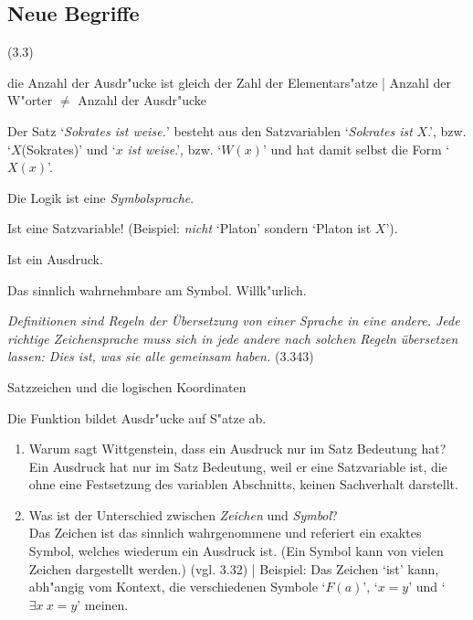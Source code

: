\documentclass[emulatestandardclasses]{scrartcl}
\begin{document}
\subsection{Neue Begriffe}

\begin{description}[leftmargin=!,labelwidth=\widthof{\bfseries Logische Syntax}]
   \item[Kontextprinzip] (3.3)
  \item[Ausdruck] die Anzahl der Ausdr"ucke ist gleich der Zahl der Elementars"atze | Anzahl der W"orter $\neq$ Anzahl der Ausdr"ucke
  \item[Satzvariable] Der Satz `\emph{Sokrates ist weise.}' besteht aus den Satzvariablen `\emph{Sokrates ist} $X$.', bzw. `$X$(Sokrates)' und `$x$ \emph{ist weise}.', bzw. `$W(x)$' und hat damit selbst die Form `$X(x)$'. 
  \item[Logische Syntax] Die Logik ist eine \emph{Symbolsprache}.
  \item[Name] Ist eine Satzvariable! (Beispiel: \emph{nicht} `Platon' sondern `Platon ist $X$').
  \item[Symbol] Ist ein Ausdruck. 
  \item[Zeichen] Das sinnlich wahrnehmbare am Symbol. Willk"urlich.
  \item[Definition] \emph{Definitionen sind Regeln der Übersetzung von einer Sprache in eine andere. Jede richtige Zeichensprache muss sich in jede andere nach solchen Regeln übersetzen lassen: Dies ist, was sie alle gemeinsam haben.} (3.343)
  \item[Logischer Ort] Satzzeichen und die logischen Koordinaten
\end{description}

Die Funktion bildet Ausdr"ucke auf S"atze ab.

\begin{enumerate}
  \item {\color{NavyBlue}Warum sagt Wittgenstein, dass ein Ausdruck nur im Satz Bedeutung hat?}\\
{\color{ForestGreen} Ein Ausdruck hat nur im Satz Bedeutung, weil er eine Satzvariable ist, die ohne eine Festsetzung des variablen Abschnitts, keinen Sachverhalt darstellt.}
  \item {\color{NavyBlue}Was ist der Unterschied zwischen \emph{Zeichen} und \emph{Symbol}? }\\
{\color{ForestGreen} Das Zeichen ist das sinnlich wahrgenommene und referiert ein exaktes Symbol, welches wiederum ein Ausdruck ist. (Ein Symbol kann von vielen Zeichen dargestellt werden.) (vgl. 3.32)} | Beispiel: Das Zeichen `ist' kann, abh"angig vom Kontext,  die verschiedenen Symbole `$F(a)$', `$x = y$' und `$\exists x~ x = y$' meinen. 
\end{enumerate}
\end{document}

